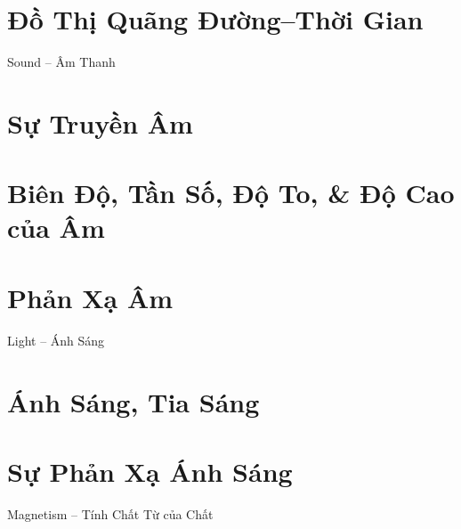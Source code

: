 \documentclass{article}
\begin{document}
\section{Đồ Thị Quãng Đường--Thời Gian}


\begin{center}\LARGE
	Sound -- Âm Thanh
\end{center}

\section{Sự Truyền Âm}


\section{Biên Độ, Tần Số, Độ To, \& Độ Cao của Âm}


\section{Phản Xạ Âm}


\begin{center}\LARGE
	Light -- Ánh Sáng
\end{center}

\section{Ánh Sáng, Tia Sáng}


\section{Sự Phản Xạ Ánh Sáng}


\begin{center}\LARGE
	Magnetism -- Tính Chất Từ của Chất
\end{center}
\end{document}
